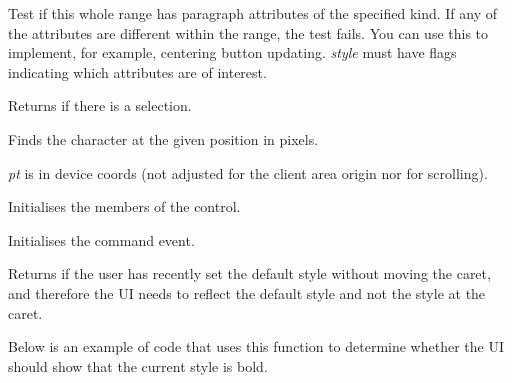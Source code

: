 
Test if this whole range has paragraph attributes of the specified kind. If any
of the attributes are different within the range, the test fails. You
can use this to implement, for example, centering button updating. {\it style} must have
flags indicating which attributes are of interest.

\label{wxrichtextctrlhasselection}


Returns \true if there is a selection.

\label{wxrichtextctrlhittest}



Finds the character at the given position in pixels.

{\it pt} is in device coords (not adjusted for the client area origin nor for scrolling).

\label{wxrichtextctrlinit}


Initialises the members of the control.

\label{wxrichtextctrlinitcommandevent}


Initialises the command event.

\label{wxrichtextctrlisdefaultstyleshowing}


Returns \true if the user has recently set the default style without moving the caret,
and therefore the UI needs to reflect the default style and not the style at the caret.

Below is an example of code that uses this function to determine whether the UI
should show that the current style is bold.

